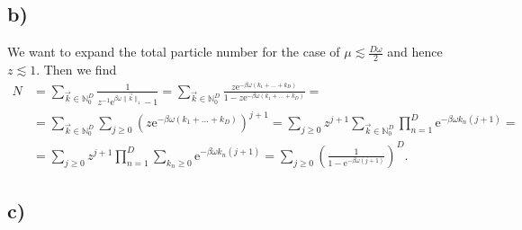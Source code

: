 \documentclass[english, parskip=full]{scrartcl}
\newcommand{\kla}{}
\newcommand{\e}{\text{e}}
\begin{document}
\subsection*{b)}
We want to expand the total particle number for the case of $\mu \lesssim \frac{D\omega}{2}$ and hence $z \lesssim 1$.
Then we find
\begin{align}
N &= \sum_{\vec{k}\in\mathbb{N}_0^D} \frac{1}{z^{-1} \e^{\beta\omega \|\vec{k}\|_1} - 1} =  \sum_{\vec{k}\in\mathbb{N}_0^D} \frac{z\e^{-\beta\omega (k_1 + \dots + k_D)}}{ 1 - z\e^{-\beta\omega (k_1 + \dots + k_D)}}  = \\
&=  \sum_{\vec{k}\in\mathbb{N}_0^D} \sum_{j\ge 0}  \left( z\e^{-\beta\omega (k_1 + \dots + k_D)} \right)^{j+1}  = \sum_{j\ge 0} z^{j+1} \sum_{\vec{k}\in\mathbb{N}_0^D} \prod_{n=1}^D \e^{-\beta\omega k_n(j+1)} = \\
&= \sum_{j\ge 0} z^{j+1} \prod_{n=1}^D \sum_{k_n \ge 0} \e^{-\beta\omega k_n(j+1)} = \sum_{j\ge 0} \kla\left( \frac{1}{1 - \e^{-\beta\omega (j+1)}} \right)^D.
\end{align}




\subsection*{c)}


\end{document}
